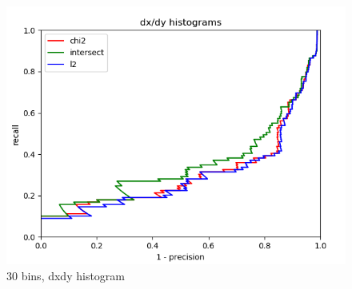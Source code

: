 \documentclass{article}
\begin{document}
\begin{figure}[ht]
\begin{minipage}{.5\textwidth}
        \includegraphics[width=\linewidth]{images/Q4.b-dxdy_histogram_30_bins.png}
        \cprotect\caption{30 bins, dxdy histogram}
    \end{minipage}
\end{figure}
\end{document}

